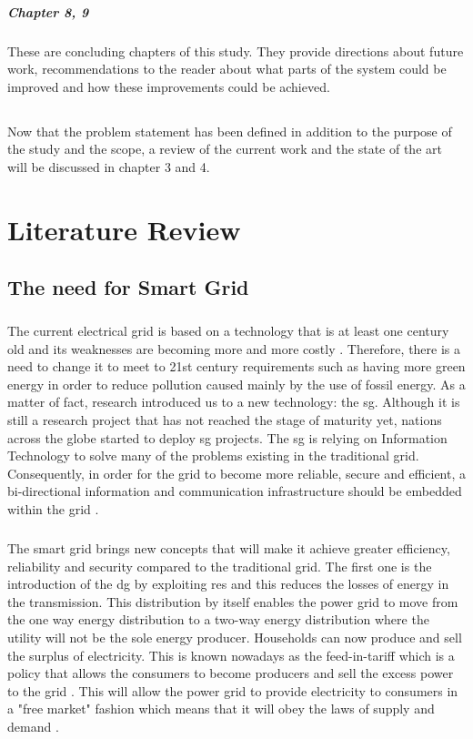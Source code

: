 \documentclass[12pt,a4paper,final]{report}
\begin{document}
\paragraph{Chapter 8, 9}
These are concluding chapters of this study. They provide directions about future work, recommendations to the reader about what parts of the system could be improved and how these improvements could be achieved.
\section*{}
\paragraph{}
Now that the problem statement has been defined in addition to the purpose of the study and the scope, a review of the current work and the state of the art will be discussed in chapter 3 and 4.
\chapter{Literature Review}
\section{The need for Smart Grid}
\paragraph{}
The current electrical grid is based on a technology that is at least one century old and its weaknesses are becoming more and more costly \cite{ref5}. Therefore, there is a need to change it to meet to 21st century requirements such as having more green energy in order to reduce pollution caused mainly by the use of fossil energy. As a matter of fact, research introduced us to a new technology: the \gls{sg}. Although it is still a research project that has not reached the stage of maturity yet, nations across the globe started to deploy \gls{sg} projects. The \gls{sg} is relying on Information Technology to solve many of the problems existing in the traditional grid. Consequently, in order for the grid to become more reliable, secure and efficient, a bi-directional information and communication infrastructure should be embedded within the grid \cite{ref5}.
\paragraph{}
The smart grid brings new concepts that will make it achieve greater efficiency, reliability and security compared to the traditional grid. The first one is the introduction of the \gls{dg} by exploiting \gls{res} \cite{ref6} and this reduces the losses of energy in the transmission.  This distribution by itself enables the power grid to move from the one way energy distribution to a two-way energy distribution where the utility will not be the sole energy producer. Households can now produce and sell the surplus of electricity. This is known nowadays as the feed-in-tariff which is a policy that allows the consumers to become producers and sell the excess power to the grid \cite{ref7}. This will allow the power grid to provide electricity to consumers in a "free market" fashion which means that it will obey the laws of supply and demand \cite{ref7}.
\end{document}
